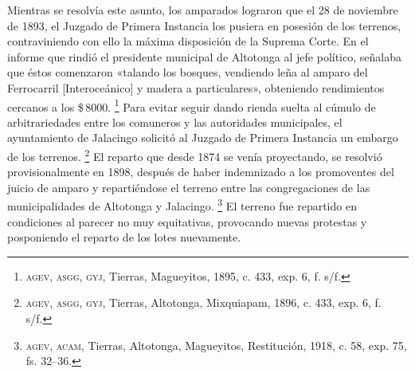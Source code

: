 \documentclass[14pt,twoside,final]{extbook} %
\let\oldfootnote\footnote
\renewcommand\footnote[1]{%
\oldfootnote{\hspace{1mm}#1}}
\begin{document}
Mientras se resolvía este asunto, los amparados lograron que el 28 de noviembre de 1893, el Juzgado de Primera Instancia los pusiera en posesión de los terrenos, contraviniendo con ello la máxima disposición de la Suprema Corte. En el informe que rindió el presidente municipal de Altotonga al jefe político, señalaba que éstos comenzaron «talando los bosques, vendiendo leña al amparo del Ferrocarril [Interoceánico] y madera a particulares», obteniendo rendimientos cercanos a los \$\,8000.\footnote{\textsc{agev, asgg, gyj}, Tierras, Magueyitos, 1895, c. 433, exp. 6, f. s/f.} Para evitar seguir dando rienda suelta al cúmulo de arbitrariedades entre los comuneros y las autoridades municipales, el ayuntamiento de Jalacingo solicitó al Juzgado de Primera Instancia un embargo de los terrenos.\footnote{\textsc{agev, asgg, gyj}, Tierras, Altotonga, Mixquiapam, 1896, c. 433, exp. 6, f. s/f.} El reparto que desde 1874 se venía proyectando, se resolvió provisionalmente en 1898, después de haber indemnizado a los promoventes del juicio de amparo y repartiéndose el terreno entre las congregaciones de las municipalidades de Altotonga y Jalacingo.\footnote{\textsc{agev, acam}, Tierras, Altotonga, Magueyitos, Restitución, 1918, c. 58, exp. 75, fs. 32--36.} El terreno fue repartido en condiciones al parecer no muy equitativas, provocando nuevas protestas y posponiendo el reparto de los lotes nuevamente.
\end{document}
